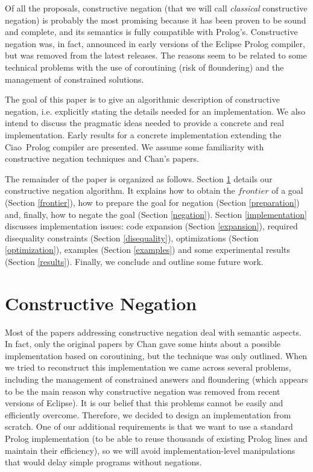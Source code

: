 \documentclass{llncs}
\newcommand{\ciao}{Ciao}
\begin{document}
Of all the proposals, constructive negation \cite{Chan1,Chan2} (that
we will call \emph{classical} constructive negation) is probably the
most promising because it has been proven to be sound and complete,
and its semantics is fully compatible with Prolog's. Constructive
negation was, in fact, announced in early versions of the Eclipse
Prolog compiler, but was removed from the latest releases.  The
reasons seem to be related to some technical problems with the use of
coroutining (risk of floundering) and the management of constrained
solutions.


The goal of this paper is to give an algorithmic description of
constructive negation, i.e. explicitly stating the details needed for
an implementation. We also intend to discuss the pragmatic ideas
needed to provide a concrete and real implementation. Early results
for a concrete implementation extending the \ciao\ Prolog compiler are
presented.  We assume some familiarity with constructive negation
techniques and Chan's papers.

The remainder of the paper is organized as follows. Section
\ref{constructive} details our constructive negation algorithm. It
explains how to obtain the $frontier$ of a goal (Section
\ref{frontier}), how to prepare the goal for negation (Section
\ref{preparation}) and, finally, how to negate the goal (Section
\ref{negation}). Section \ref{implementation} discusses implementation
issues: code expansion (Section \ref{expansion}), required disequality
constraints (Section \ref{disequality}), optimizations (Section
\ref{optimization}), examples (Section \ref{examples}) and some
experimental results (Section \ref{results}).  Finally, we conclude
and outline some future work.
 


\section{Constructive Negation}
\label{constructive}

Most of the papers addressing constructive negation deal with semantic
aspects. In fact, only the original papers by Chan gave some hints
about a possible implementation based on coroutining, but the
technique was only outlined. When we tried to reconstruct this
implementation we came across several problems, including the
management of constrained answers and floundering (which appears to be
the main reason why constructive negation was removed from recent
versions of Eclipse). It is our belief that this problems cannot be
easily and efficiently overcome. Therefore, we decided to design an
implementation from scratch.  One of our additional requirements is
that we want to use a standard Prolog implementation (to be able to
reuse thousands of existing Prolog lines and maintain their
efficiency), so we will avoid implementation-level manipulations that
would delay simple programs without negations.
\end{document}

